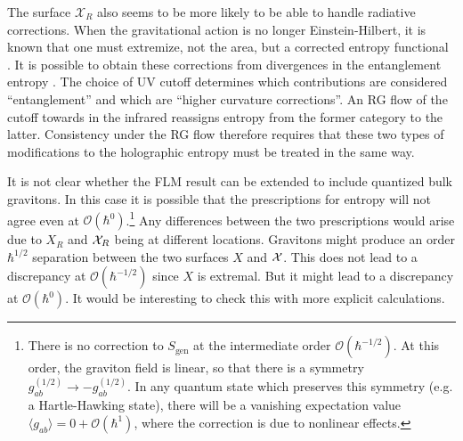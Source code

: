 \documentclass[12pt]{article}
\theoremstyle{remark}
\numberwithin{equation}{section}
\numberwithin{equation}{section}
\begin{document}
The surface $\mathcal{X}_{R}$ also seems to be more likely to be able to handle radiative corrections.  When the gravitational action is no longer Einstein-Hilbert, it is known that one must extremize, not the area, but a corrected entropy functional \cite{Sarkar:2013swa, Dong, Fursaev:2013fta, Camps:2013zua, Bhattacharyya:2013gra, Bhattacharyya:2014yga, Hung:2011xb, deBoer:2011wk}. It is possible to obtain these corrections from divergences in the entanglement entropy \cite{ 33}.  The choice of UV cutoff determines which contributions are considered ``entanglement'' and which are ``higher curvature corrections''.   An RG flow of the cutoff towards in the infrared reassigns entropy from the former category to the latter.  Consistency under the RG flow therefore requires that these two types of modifications to the holographic entropy must be treated in the same way.

It is not clear whether the FLM result can be extended to include quantized bulk gravitons.  In this case it is possible that the prescriptions for entropy will not agree even at $\mathcal{O}(\hbar^{0})$.\footnote{There is no correction to $S_\mathrm{gen}$ at the intermediate order $\mathcal{O}(\hbar^{-1/2})$.  At this order, the graviton field is linear, so that there is a symmetry $g_{ab}^{(1/2)} \to - g_{ab}^{(1/2)}$.  In any quantum state which preserves this symmetry (e.g. a Hartle-Hawking state), there will be a vanishing expectation value $\langle g_{ab} \rangle = 0 + \mathcal{O}(\hbar^1)$, where the correction is due to nonlinear effects.} Any differences between the two prescriptions would arise due to $X_R$ and ${\cal X}_R$ being at different locations.  Gravitons might produce an order $\hbar^{1/2}$ separation between the two surfaces $X$ and ${\cal X}$.  This does not lead to a discrepancy at $\mathcal{O}(\hbar^{-1/2})$ since $X$ is extremal.  But it might lead to a discrepancy at $\mathcal{O}(\hbar^{0})$. It would be interesting to check this with more explicit calculations.
\end{document}

